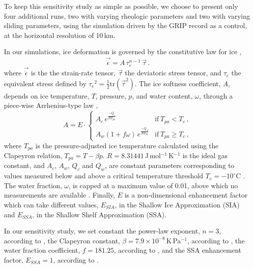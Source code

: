 To keep this sensitivity study as simple as possible, we choose to present only
four additional runs, two with varying rheologic parameters and two with
varying sliding parameters, using the simulation driven by the GRIP record as
a control, at the horizontal resolution of 10\,km.

In our simulations, ice deformation is governed by the constitutive law for ice
\citep{Glen.1952, Nye.1953},
%
\begin{equation}
    \label{eqn:glenslaw}
    \vec{\dot{\epsilon}} = A\,\tau_e^{n-1}\,\vec{\tau} \,.
\end{equation}
%
where $\vec{\dot{\epsilon}}$ is the the strain-rate tensor, $\vec{\tau}$ the
deviatoric stress tensor, and $\tau_e$ the equivalent stress defined by
${\tau_e}^2 = \frac{1}{2} \mathrm{tr}(\vec{\tau}^2)$.
The ice softness coefficient, $A$, depends on ice temperature, $T$, pressure, $p$, and
water content, $\omega$, through a piece-wise Arrhenius-type law
\citep[Eqs.~63--65]{Aschwanden.etal.2012},
%
\begin{equation}
    \label{eqn:softness}
    A = E\cdot
    \begin{cases}
        A_c \,e^\frac{-Q_c}{RT_{pa}}
            & \text{if}\ T_{pa} < T_c \,, \\
        A_w (1+f\omega)\,e^\frac{-Q_w}{RT_{pa}}
            & \text{if}\ T_{pa} \ge T_c \,,
    \end{cases}
\end{equation}
%
where $T_{pa}$ is the pressure-adjusted ice temperature calculated using the
Clapeyron relation, ${T_{pa} = T - \beta p}$.
$R=8.31441$\,J\,mol$^{-1}$\,K$^{-1}$ is the ideal gas constant, and $A_c$,
$A_w$, $Q_c$ and $Q_w$, are constant parameters corresponding to values
measured below and above a critical temperature threshold ${T_c=-10}^\circ$C
\citep[p.~72]{Paterson.Budd.1982,Cuffey.Paterson.2010}. The water fraction,
$\omega$, is capped at a maximum value of 0.01, above which no measurements
are available \citep[Eq.~5.7]{Lliboutry.Duval.1985, Greve.1997}. Finally,
$E$ is a non-dimensional enhancement factor which can take different values,
$E_{SIA}$, in the Shallow Ice Approximation (SIA) and $E_{SSA}$, in the Shallow
Shelf Approximation (SSA).

In our sensitivity study, we set constant the power-law exponent, $n=3$,
according to \citet[p.~55--57]{Cuffey.Paterson.2010}, the Clapeyron constant,
$\beta=7.9\times 10^{-8}$\,K\,Pa$^{-1}$, according to \citep{Luthi.etal.2002},
the water fraction coefficient, $f=181.25$, according to
\citet{Lliboutry.Duval.1985}, and the SSA enhancement factor, $E_{SSA}=1$,
according to \citep[p.~77]{Cuffey.Paterson.2010}.

